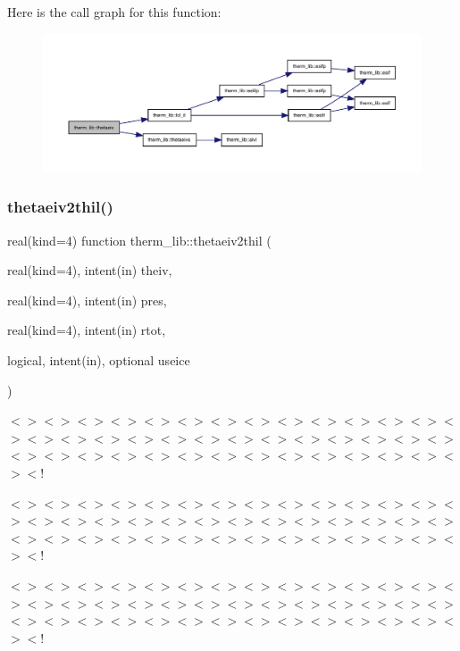 Here is the call graph for this function\+:
\nopagebreak
\begin{figure}[H]
\begin{center}
\leavevmode
\includegraphics[width=350pt]{namespacetherm__lib_a2523d158beee975faaed4552724aae65_cgraph}
\end{center}
\end{figure}
\mbox{\label{namespacetherm__lib_a567e8e6a001cab2a0991a88f7b7fc28f}} 
\subsubsection{\texorpdfstring{thetaeiv2thil()}{thetaeiv2thil()}}
{\footnotesize\ttfamily real(kind=4) function therm\+\_\+lib\+::thetaeiv2thil (\begin{DoxyParamCaption}\item[{real(kind=4), intent(in)}]{theiv,  }\item[{real(kind=4), intent(in)}]{pres,  }\item[{real(kind=4), intent(in)}]{rtot,  }\item[{logical, intent(in), optional}]{useice }\end{DoxyParamCaption})}

$<$$>$$<$$>$$<$$>$$<$$>$$<$$>$$<$$>$$<$$>$$<$$>$$<$$>$$<$$>$$<$$>$$<$$>$$<$$>$$<$$>$$<$$>$$<$$>$$<$$>$$<$$>$$<$$>$$<$$>$$<$$>$$<$$>$$<$$>$$<$$>$$<$$>$$<$$>$$<$$>$$<$$>$$<$$>$$<$$>$$<$$>$$<$$>$$<$$>$$<$$>$$<$$>$$<$$>$$<$$>$$<$$>$$<$$>$$<$$>$$<$$>$$<$!

$<$$>$$<$$>$$<$$>$$<$$>$$<$$>$$<$$>$$<$$>$$<$$>$$<$$>$$<$$>$$<$$>$$<$$>$$<$$>$$<$$>$$<$$>$$<$$>$$<$$>$$<$$>$$<$$>$$<$$>$$<$$>$$<$$>$$<$$>$$<$$>$$<$$>$$<$$>$$<$$>$$<$$>$$<$$>$$<$$>$$<$$>$$<$$>$$<$$>$$<$$>$$<$$>$$<$$>$$<$$>$$<$$>$$<$$>$$<$$>$$<$$>$$<$!

$<$$>$$<$$>$$<$$>$$<$$>$$<$$>$$<$$>$$<$$>$$<$$>$$<$$>$$<$$>$$<$$>$$<$$>$$<$$>$$<$$>$$<$$>$$<$$>$$<$$>$$<$$>$$<$$>$$<$$>$$<$$>$$<$$>$$<$$>$$<$$>$$<$$>$$<$$>$$<$$>$$<$$>$$<$$>$$<$$>$$<$$>$$<$$>$$<$$>$$<$$>$$<$$>$$<$$>$$<$$>$$<$$>$$<$$>$$<$$>$$<$$>$$<$!

